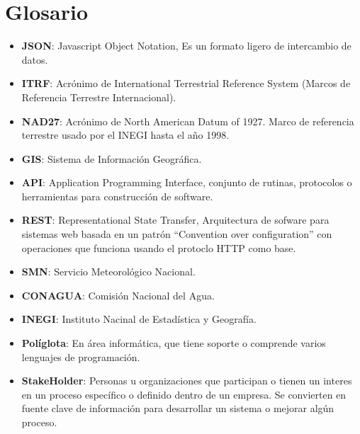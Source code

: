 \newpage
\section*{Glosario}
\begin{itemize}
	\item \textbf{JSON}: Javascript Object Notation, Es un formato ligero de intercambio de datos.
	\item \textbf{ITRF}: Acrónimo de International Terrestrial Reference System (Marcos de Referencia Terrestre Internacional).
	\item \textbf{NAD27}: Acrónimo de North American Datum of 1927. Marco de referencia terrestre usado por el INEGI hasta el año 1998.
	\item \textbf{GIS}: Sistema de Información Geográfica.
  \item \textbf{API}: Application Programming Interface, conjunto de rutinas, protocolos o herramientas para construcción de software.
  \item \textbf{REST}: Representational State Transfer, Arquitectura de sofware para sistemas web basada en un patrón ``Convention over configuration'' con operaciones que funciona usando el protoclo HTTP como base.
  \item \textbf{SMN}: Servicio Meteorológico Nacional.
  \item \textbf{CONAGUA}: Comisión Nacional del Agua.
  \item \textbf{INEGI}: Instituto Nacinal de Estadística y Geografía.
  \item \textbf{Políglota}: En área informática, que tiene soporte o comprende varios lenguajes de programación.
  \item \textbf{StakeHolder}: Personas u organizaciones que participan o tienen un interes en un proceso específico o definido dentro de un empresa. Se convierten en fuente clave de información para desarrollar un sistema o mejorar algún proceso.

\end{itemize}

